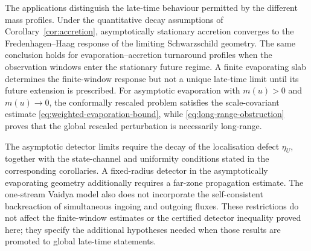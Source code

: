 \documentclass[11pt,a4paper]{article}
\theoremstyle{definition}
\theoremstyle{remark}
\begin{document}
	The applications distinguish the late-time behaviour permitted by the
	different mass profiles.  Under the quantitative decay assumptions of
	Corollary~\ref{cor:accretion}, asymptotically stationary accretion converges
	to the Fredenhagen--Haag response of the limiting Schwarzschild geometry.
	The same conclusion holds for evaporation--accretion turnaround profiles
	when the observation windows enter the stationary future regime.  A finite
	evaporating slab determines the finite-window response but not a unique
	late-time limit until its future extension is prescribed.  For asymptotic
	evaporation with $m(u)>0$ and $m(u)\to0$, the conformally rescaled problem
	satisfies the scale-covariant estimate
	\eqref{eq:weighted-evaporation-bound}, while
	\eqref{eq:long-range-obstruction} proves that the global rescaled
	perturbation is necessarily long-range.
	
	The asymptotic detector limits require the decay of the localisation defect
	$\eta_U$, together with the state-channel and uniformity conditions stated in
	the corresponding corollaries.  A fixed-radius detector in the asymptotically
	evaporating geometry additionally requires a far-zone propagation estimate.
	The one-stream Vaidya model also does not incorporate the self-consistent
	backreaction of simultaneous ingoing and outgoing fluxes.  These restrictions
	do not affect the finite-window estimates or the certified detector
	inequality proved here; they specify the additional hypotheses needed when
	those results are promoted to global late-time statements.
	
\end{document}
